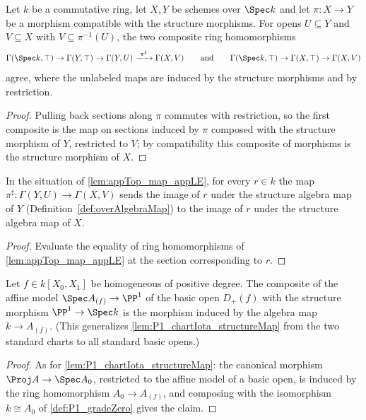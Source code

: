 \begin{lemma}
  \label{lem:appTop_map_appLE}
  \leanok
  Let \(k\) be a commutative ring, let \(X, Y\) be schemes over \(\Spec k\) and let
  \(\pi : X \to Y\) be a morphism compatible with the structure morphisms. For opens
  \(U \subseteq Y\) and \(V \subseteq X\) with \(V \subseteq \pi^{-1}(U)\), the two
  composite ring homomorphisms
  \[
    \Gamma(\Spec k, \top) \to \Gamma(Y, \top) \to \Gamma(Y, U)
      \xrightarrow{\ \pi^\sharp\ } \Gamma(X, V)
    \qquad\text{and}\qquad
    \Gamma(\Spec k, \top) \to \Gamma(X, \top) \to \Gamma(X, V)
  \]
  agree, where the unlabeled maps are induced by the structure morphisms and by
  restriction.
\end{lemma}
\begin{proof}
  \leanok
  Pulling back sections along \(\pi\) commutes with restriction, so the first composite is
  the map on sections induced by \(\pi\) composed with the structure morphism of \(Y\),
  restricted to \(V\); by compatibility this composite of morphisms is the structure
  morphism of \(X\).
\end{proof}

\begin{lemma}
  \label{lem:appLE_overAlgebraMap}
  \leanok
  In the situation of \ref{lem:appTop_map_appLE}, for every \(r \in k\) the map
  \(\pi^\sharp : \Gamma(Y, U) \to \Gamma(X, V)\) sends the image of \(r\) under the
  structure algebra map of \(Y\) (Definition~\ref{def:overAlgebraMap}) to the image of
  \(r\) under the structure algebra map of \(X\).
\end{lemma}
\begin{proof}
  \leanok
  Evaluate the equality of ring homomorphisms of \ref{lem:appTop_map_appLE} at the section
  corresponding to \(r\).
\end{proof}

\begin{lemma}
  \label{lem:P1_awayi_structureMap}
  \leanok
  Let \(f \in k[X_0, X_1]\) be homogeneous of positive degree. The composite of the affine
  model \(\Spec A_{(f)} \to \PP^1\) of the basic open \(D_+(f)\) with the structure
  morphism \(\PP^1 \to \Spec k\) is the morphism induced by the algebra map
  \(k \to A_{(f)}\). (This generalizes \ref{lem:P1_chartIota_structureMap} from the two
  standard charts to all standard basic opens.)
\end{lemma}
\begin{proof}
  \leanok
  As for \ref{lem:P1_chartIota_structureMap}: the canonical morphism
  \(\Proj A \to \Spec A_0\), restricted to the affine model of a basic open, is induced by
  the ring homomorphism \(A_0 \to A_{(f)}\), and composing with the isomorphism
  \(k \cong A_0\) of \ref{def:P1_gradeZero} gives the claim.
\end{proof}


